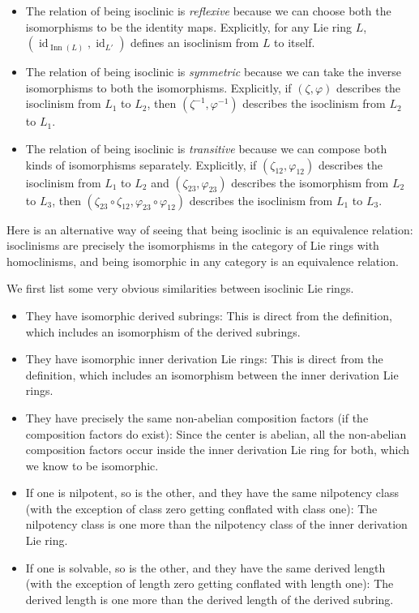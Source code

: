 \begin{itemize}
\item The relation of being isoclinic is {\em reflexive} because we
  can choose both the isomorphisms to be the identity
  maps. Explicitly, for any Lie ring $L$,
  $(\operatorname{id}_{\operatorname{Inn}(L)},\operatorname{id}_{L'})$
  defines an isoclinism from $L$ to itself.
\item The relation of being isoclinic is {\em symmetric} because we
  can take the inverse isomorphisms to both the
  isomorphisms. Explicitly, if $(\zeta,\varphi)$ describes the
  isoclinism from $L_1$ to $L_2$, then $(\zeta^{-1},\varphi^{-1})$
  describes the isoclinism from $L_2$ to $L_1$.
\item The relation of being isoclinic is {\em transitive} because we
  can compose both kinds of isomorphisms separately. Explicitly, if
  $(\zeta_{12},\varphi_{12})$ describes the isoclinism from $L_1$ to
  $L_2$ and $(\zeta_{23},\varphi_{23})$ describes the isomorphism from
  $L_2$ to $L_3$, then $(\zeta_{23} \circ \zeta_{12}, \varphi_{23}
  \circ \varphi_{12})$ describes the isoclinism from $L_1$ to $L_3$.
\end{itemize}

Here is an alternative way of seeing that being isoclinic is an
equivalence relation: isoclinisms are precisely the isomorphisms in
the category of Lie rings with homoclinisms, and being isomorphic in any
category is an equivalence relation.

We first list some very obvious similarities between isoclinic Lie rings.

\begin{itemize}
\item They have isomorphic derived subrings: This is direct from the
  definition, which includes an isomorphism of the derived subrings.
\item They have isomorphic inner derivation Lie rings: This is direct
  from the definition, which includes an isomorphism between the inner
  derivation Lie rings.
\item They have precisely the same non-abelian composition factors (if
  the composition factors do exist): Since the center is abelian, all
  the non-abelian composition factors occur inside the inner
  derivation Lie ring for both, which we know to be isomorphic.
\item If one is nilpotent, so is the other, and they have the same
  nilpotency class (with the exception of class zero getting conflated
  with class one): The nilpotency class is one more than the
  nilpotency class of the inner derivation Lie ring.
\item If one is solvable, so is the other, and they have the same
  derived length (with the exception of length zero getting conflated
  with length one): The derived length is one more than the derived
  length of the derived subring.
\end{itemize}

